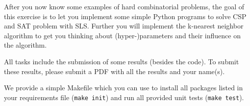 \documentclass{exam}
\begin{document}
	\gccs
	After you now know some examples of hard combinatorial problems, the goal of this exercise is to let you implement some simple Python programs to solve CSP and SAT problem with SLS. Further you will implement the k-nearest neighbor algorithm to get you thinking about (hyper-)parameters and their influence on the algorithm.
	
	\bigskip
	
	\noindent All tasks include the submission of some results (besides the code).
	To submit these results, please submit a PDF with all the results and your name(s).
	
	\noindent We provide a simple Makefile which you can use to install all packages listed in your requirements file (\texttt{make init}) and run all provided unit tests (\texttt{make test}).
	
\end{document}
